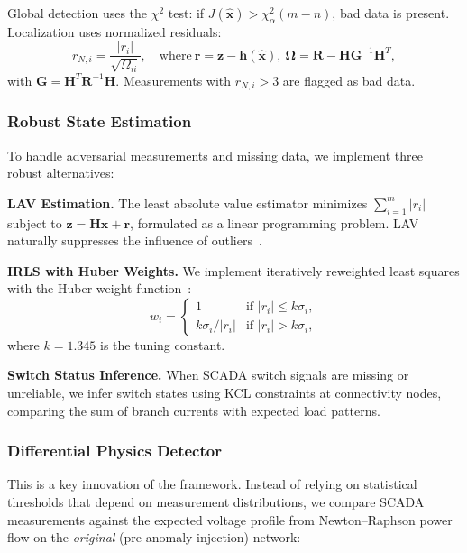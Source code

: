 \documentclass[research]{fcs}
\begin{document}
Global detection uses the $\chi^2$ test: if $J(\hat{\mathbf{x}}) > \chi^2_\alpha(m - n)$, bad data is present. Localization uses normalized residuals:
\begin{equation}
r_{N,i} = \frac{|r_i|}{\sqrt{\Omega_{ii}}}, \quad \text{where}\ \mathbf{r} = \mathbf{z} - \mathbf{h}(\hat{\mathbf{x}}),\ \boldsymbol{\Omega} = \mathbf{R} - \mathbf{H}\mathbf{G}^{-1}\mathbf{H}^T,
\end{equation}
with $\mathbf{G} = \mathbf{H}^T \mathbf{R}^{-1} \mathbf{H}$. Measurements with $r_{N,i} > 3$ are flagged as bad data.

\subsubsection{Robust State Estimation}

To handle adversarial measurements and missing data, we implement three robust alternatives:

\textbf{LAV Estimation.} The least absolute value estimator minimizes $\sum_{i=1}^m |r_i|$ subject to $\mathbf{z} = \mathbf{H}\mathbf{x} + \mathbf{r}$, formulated as a linear programming problem. LAV naturally suppresses the influence of outliers~\cite{lav1991state}.

\textbf{IRLS with Huber Weights.} We implement iteratively reweighted least squares with the Huber weight function~\cite{huber1964robust}:
\begin{equation}
w_i = \begin{cases} 1 & \text{if } |r_i| \leq k\sigma_i, \\ k\sigma_i / |r_i| & \text{if } |r_i| > k\sigma_i, \end{cases}
\end{equation}
where $k = 1.345$ is the tuning constant.

\textbf{Switch Status Inference.} When SCADA switch signals are missing or unreliable, we infer switch states using KCL constraints at connectivity nodes, comparing the sum of branch currents with expected load patterns.

\subsubsection{Differential Physics Detector}

This is a key innovation of the framework. Instead of relying on statistical thresholds that depend on measurement distributions, we compare SCADA measurements against the expected voltage profile from Newton--Raphson power flow on the \emph{original} (pre-anomaly-injection) network:
\end{document}
